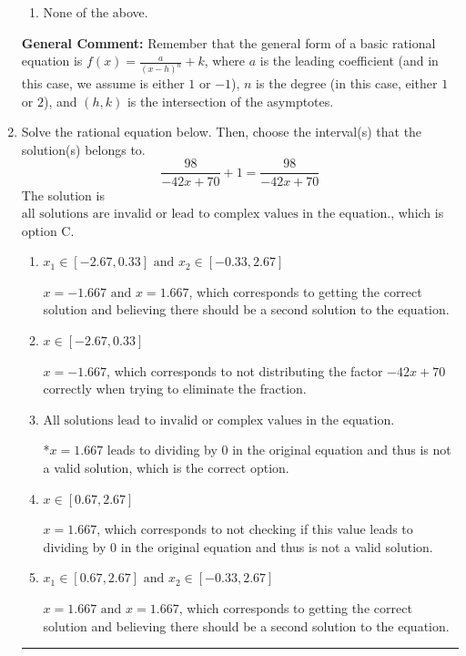 \documentclass{extbook}[14pt]
\newcommand{\litem}[1]{\item #1

\rule{\textwidth}{0.4pt}}
\begin{document}
\begin{enumerate}
{\begin{enumerate}[label=\Alph*.]
\begin{multicols}{2}
\end{multicols}\item None of the above.\end{enumerate}
\textbf{General Comment:} Remember that the general form of a basic rational equation is $ f(x) = \frac{a}{(x-h)^n} + k$, where $a$ is the leading coefficient (and in this case, we assume is either $1$ or $-1$), $n$ is the degree (in this case, either $1$ or $2$), and $(h, k)$ is the intersection of the asymptotes.
}
\litem{
Solve the rational equation below. Then, choose the interval(s) that the solution(s) belongs to.
\[ \frac{98}{-42x + 70} + 1 = \frac{98}{-42x + 70} \]The solution is \( \text{all solutions are invalid or lead to complex values in the equation.} \), which is option C.\begin{enumerate}[label=\Alph*.]
\item \( x_1 \in [-2.67, 0.33] \text{ and } x_2 \in [-0.33,2.67] \)

$x = -1.667 \text{ and } x = 1.667$, which corresponds to getting the correct solution and believing there should be a second solution to the equation.
\item \( x \in [-2.67,0.33] \)

$x = -1.667$, which corresponds to not distributing the factor $-42x + 70$ correctly when trying to eliminate the fraction.
\item \( \text{All solutions lead to invalid or complex values in the equation.} \)

*$x = 1.667$ leads to dividing by 0 in the original equation and thus is not a valid solution, which is the correct option.
\item \( x \in [0.67,2.67] \)

$x = 1.667$, which corresponds to not checking if this value leads to dividing by 0 in the original equation and thus is not a valid solution.
\item \( x_1 \in [0.67, 2.67] \text{ and } x_2 \in [-0.33,2.67] \)

$x = 1.667 \text{ and } x = 1.667$, which corresponds to getting the correct solution and believing there should be a second solution to the equation.
\end{enumerate}

}
\end{enumerate}
\end{document}
